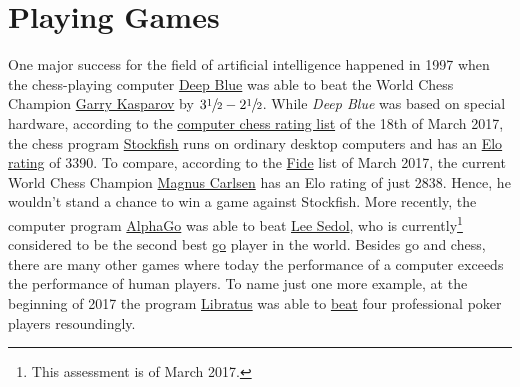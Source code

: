 \chapter{Playing Games}
One major success for the field of artificial intelligence happened in 1997 when the chess-playing computer
\href{https://en.wikipedia.org/wiki/Deep_Blue_(chess_computer)}{Deep Blue} was able to beat the World Chess
Champion \href{https://en.wikipedia.org/wiki/Garry_Kasparov}{Garry Kasparov} by $3\sfrac{1}{2}-2\sfrac{1}{2}$.
While \emph{\color{blue}Deep Blue} was based on special hardware, according to the
\href{http://www.computerchess.org.uk/ccrl/4040/rating_list_all.html}{computer chess rating list} of the 18th
of March 2017, the chess program \href{https://en.wikipedia.org/wiki/Stockfish_(chess)}{Stockfish} runs
on ordinary desktop computers and has an \href{https://en.wikipedia.org/wiki/Elo_rating_system}{Elo rating} of 3390.  
To compare, according to the
\href{https://ratings.fide.com/top.phtml?list=men}{Fide} list of March 2017, the current 
World Chess Champion \href{https://en.wikipedia.org/wiki/Magnus_Carlsen}{Magnus Carlsen} has an Elo rating of
just 2838.  Hence, he wouldn't stand a chance to win a game against Stockfish.  More recently, the computer program
\href{https://en.wikipedia.org/wiki/AlphaGo}{AlphaGo} was able to beat
\href{https://en.wikipedia.org/wiki/Lee_Sedol}{Lee Sedol}, who is 
currently\footnote{This assessment is of March 2017.} 
considered to be the second best  
\href{https://en.wikipedia.org/wiki/Go_(game)}{go} player in the world.  Besides go and chess, there are many
other games where today the performance of a computer exceeds the performance of human players.  To name just
one more example, at the beginning of 2017 the program \href{https://en.wikipedia.org/wiki/Libratus}{Libratus} was able to 
\href{https://www.engadget.com/2017/01/31/libratus-the-poker-playing-ai-destroyed-its-four-human-rivals/}{beat}
four professional poker players resoundingly.

